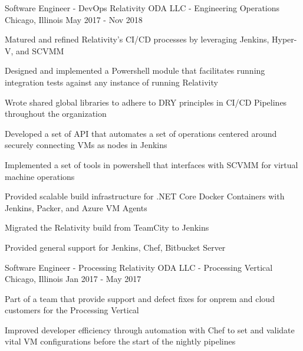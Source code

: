 
\begin{cventries}

  \cventry
    {Software Engineer - DevOps} %
    {Relativity ODA LLC - Engineering Operations} %
    {Chicago, Illinois} %
    {May 2017 - Nov 2018} %
    {
      \begin{cvitems} %
        \item {Matured and refined Relativity's CI/CD processes by leveraging Jenkins, Hyper-V, and SCVMM}
        \item {Designed and implemented a Powershell module that facilitates running integration tests against any instance of running Relativity}
        \item {Wrote shared global libraries to adhere to DRY principles in CI/CD Pipelines throughout the organization}
        \item {Developed a set of API that automates a set of operations centered around securely connecting VMs as nodes in Jenkins}
        \item {Implemented a set of tools in powershell that interfaces with SCVMM for virtual machine operations}
        \item {Provided scalable build infrastructure for .NET Core Docker Containers with Jenkins, Packer, and Azure VM Agents}
        \item {Migrated the Relativity build from TeamCity to Jenkins}
        \item {Provided general support for Jenkins, Chef, Bitbucket Server}
      \end{cvitems}
    }
    
  \cventry
    {Software Engineer - Processing} %
    {Relativity ODA LLC - Processing Vertical} %
    {Chicago, Illinois} %
    {Jan 2017 - May 2017} %
    {
      \begin{cvitems} %
        \item {Part of a team that provide support and defect fixes for onprem and cloud customers for the Processing Vertical}
        \item {Improved developer efficiency through automation with Chef to set and validate vital VM configurations before the start of the nightly pipelines}
      \end{cvitems}
    }
    


\end{cventries}
